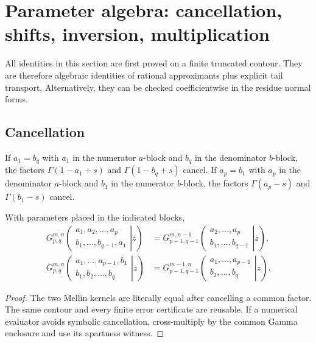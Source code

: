 \section{Parameter algebra: cancellation, shifts, inversion, multiplication}\label{sec:algebra}

All identities in this section are first proved on a finite truncated contour.
They are therefore algebraic identities of rational approximants plus explicit
tail transport.  Alternatively, they can be checked coefficientwise in the
residue normal forms.

\subsection{Cancellation}

If $a_1=b_q$ with $a_1$ in the numerator $a$-block and $b_q$ in the denominator
$b$-block, the factors
$\Gamma(1-a_1+s)$ and $\Gamma(1-b_q+s)$ cancel.  If $a_p=b_1$ with $a_p$ in the
denominator $a$-block and $b_1$ in the numerator $b$-block, the factors
$\Gamma(a_p-s)$ and $\Gamma(b_1-s)$ cancel.

\begin{theorem}\label{thm:cancellation}
With parameters placed in the indicated blocks,
\begin{align}
G_{p,q}^{m,n}\!\left(
 \left.\begin{matrix}a_1,a_2,\ldots,a_p\\b_1,\ldots,b_{q-1},a_1\end{matrix}\right|z\right)
&=G_{p-1,q-1}^{m,n-1}\!\left(
 \left.\begin{matrix}a_2,\ldots,a_p\\b_1,\ldots,b_{q-1}\end{matrix}\right|z\right),\label{eq:cancel-one}\\
G_{p,q}^{m,n}\!\left(
 \left.\begin{matrix}a_1,\ldots,a_{p-1},b_1\\b_1,b_2,\ldots,b_q\end{matrix}\right|z\right)
&=G_{p-1,q-1}^{m-1,n}\!\left(
 \left.\begin{matrix}a_1,\ldots,a_{p-1}\\b_2,\ldots,b_q\end{matrix}\right|z\right).
\label{eq:cancel-two}
\end{align}
\end{theorem}
\begin{proof}
The two Mellin kernels are literally equal after cancelling a common factor.
The same contour and every finite error certificate are reusable.  If a
numerical evaluator avoids symbolic cancellation, cross-multiply by the common
Gamma enclosure and use its apartness witness.
\end{proof}


